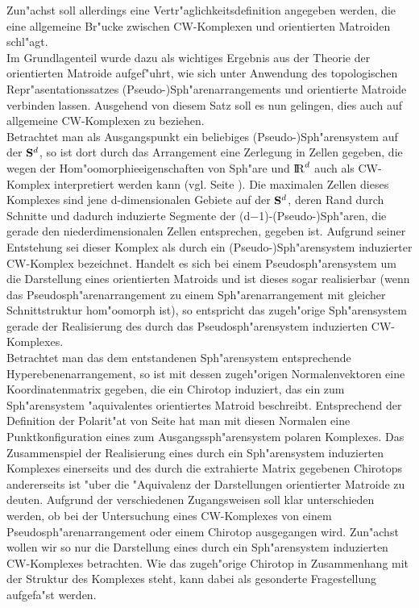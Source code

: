 Zun"achst soll allerdings eine Vertr"aglichkeitsdefinition angegeben werden,
die eine allgemeine Br"ucke zwischen CW-Komplexen und orientierten Matroiden
schl"agt.\\
Im Grundlagenteil wurde dazu als wichtiges Ergebnis aus der Theorie der
orientierten Matroide aufgef"uhrt, wie sich unter Anwendung des topologischen
Repr"asentationssatzes (Pseudo-)Sph"arenarrangements und orientierte Matroide
verbinden lassen. Ausgehend von diesem Satz soll es nun gelingen, dies auch auf
allgemeine CW-Komplexen zu beziehen.\\
Betrachtet man als Ausgangspunkt ein beliebiges (Pseudo-)Sph"arensystem auf
der $\S^d$, so ist dort durch das Arrangement eine Zerlegung in Zellen gegeben,
die wegen der Hom"oomorphieeigenschaften von Sph"are und $\R^d$ auch als
CW-Komplex interpretiert werden kann (vgl. Seite \pageref{cell}). Die maximalen
Zellen dieses Komplexes sind jene d-dimensionalen Gebiete auf der $\S^d$, deren
Rand durch Schnitte und dadurch induzierte Segmente der
(d$-$1)-(Pseudo-)Sph"aren, die gerade den niederdimensionalen Zellen
entsprechen, gegeben ist. Aufgrund seiner Entstehung sei dieser Komplex als
durch ein (Pseudo-)Sph"arensystem induzierter CW-Komplex  bezeichnet. Handelt es sich bei einem Pseudosph"arensystem um die
Darstellung eines orientierten Matroids und ist dieses sogar realisierbar (wenn
das Pseudosph"arenarrangement zu einem Sph"arenarrangement mit gleicher
Schnittstruktur hom"oomorph ist), so entspricht das zugeh"orige Sph"arensystem
gerade der Realisierung des durch das Pseudosph"arensystem induzierten
CW-Komplexes.\\
Betrachtet man das dem entstandenen Sph"arensystem entsprechende
Hyperebenenarrangement, so ist mit dessen zugeh"origen Normalenvektoren eine
Koordinatenmatrix gegeben, die ein Chirotop induziert, das ein zum
Sph"arensystem "aquivalentes orientiertes Matroid beschreibt. Entsprechend der
Definition der Polarit"at von Seite \pageref{polar} hat man mit diesen Normalen
eine Punktkonfiguration eines zum Ausgangssph"arensystem polaren Komplexes. Das
Zusammenspiel der Realisierung eines durch ein Sph"arensystem induzierten
Komplexes einerseits und des durch die extrahierte Matrix gegebenen Chirotops
andererseits ist "uber die "Aquivalenz der Darstellungen orientierter Matroide
zu deuten. Aufgrund der verschiedenen Zugangsweisen soll klar unterschieden
werden, ob bei der Untersuchung eines CW-Komplexes von einem
Pseudosph"arenarrangement oder einem Chirotop ausgegangen wird. Zun"achst wollen
wir so nur die Darstellung eines durch ein Sph"arensystem induzierten
CW-Komplexes betrachten. Wie das zugeh"orige Chirotop in Zusammenhang mit der
Struktur des Komplexes steht, kann dabei als gesonderte Fragestellung
aufgefa"st werden.

